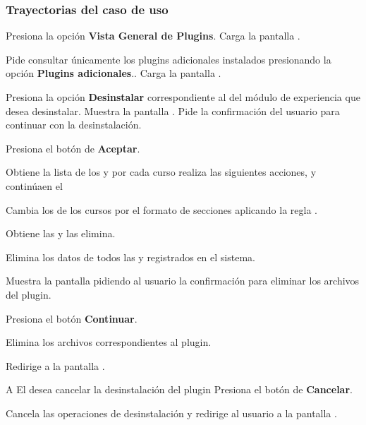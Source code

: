 \subsubsection{Trayectorias del caso de uso}

\begin{UCtrayectoria}%
%
  \Actor Presiona la opción {\bf Vista General de Plugins}.
  \Sistema Carga la pantalla .

  \Actor Pide consultar únicamente los plugins adicionales instalados presionando
         la opción {\bf Plugins adicionales}..
  \Sistema Carga la pantalla .

  \Actor Presiona la opción {\bf Desinstalar} correspondiente al
          del módulo de experiencia que desea desinstalar.
  \Sistema Muestra la pantalla .
  \Sistema Pide la confirmación del usuario para continuar con la desinstalación.

  \Actor Presiona el botón de {\bf Aceptar}. 

  \Sistema Obtiene la lista de los  y por cada curso
           realiza las siguientes acciones, y continúaen el \label{CU-E03-loop-delete-course}

  \Sistema Cambia los  de los cursos por el formato de
           secciones aplicando la regla .

  \Sistema Obtiene las 
           y las elimina.

  \Sistema Elimina los datos de todos las  y 
           registrados en el sistema.

  \Sistema Muestra la pantalla  pidiendo al usuario la confirmación
           para eliminar los archivos del plugin.

  \Actor Presiona el botón {\bf Continuar}. 


  \Sistema Elimina los archivos correspondientes al plugin.

  \Sistema Redirige a la pantalla .

\end{UCtrayectoria}

\begin{UCtrayectoriaA}{A}{%
El  desea cancelar la desinstalación del plugin
}
  \Actor Presiona el botón de {\bf Cancelar}.

  \Sistema Cancela las operaciones de desinstalación y redirige al usuario a la
           pantalla .
\end{UCtrayectoriaA}

